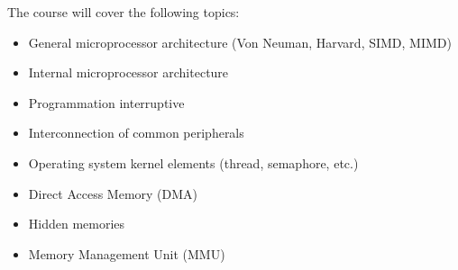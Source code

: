 The course will cover the following topics:
\begin{itemize}
    \item General microprocessor architecture (Von Neuman, Harvard, SIMD, MIMD)
    \item Internal microprocessor architecture
    \item Programmation interruptive
    \item Interconnection of common peripherals
    \item Operating system kernel elements (thread, semaphore, etc.)
    \item Direct Access Memory (DMA)
    \item Hidden memories
    \item Memory Management Unit (MMU)
\end{itemize}
